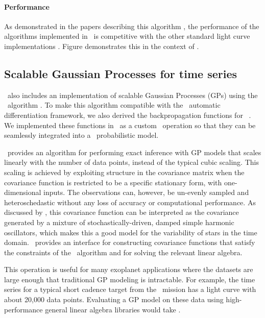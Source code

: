 \documentclass[modern]{aastex62}
\begin{document}
\paragraph{Performance}
As demonstrated in the papers describing this algorithm \citep{Luger:2019} , the performance of the algorithms implemented in \starry\ is competitive with the other standard light curve implementations .
Figure  demonstrates this in the context of \exoplanet.


\subsection{Scalable Gaussian Processes for time series}

\exoplanet\ also includes an implementation of scalable Gaussian Processes (GPs) using the \celerite\ algorithm \citep{Foreman-Mackey:2017}.
To make this algorithm compatible with the \theano\ automatic differentiation framework, we also derived the backpropagation functions for \celerite\ \citep{Foreman-Mackey:2018a}.
We implemented these functions in \cpp\ as a custom \theano\ operation so that they can be seamlessly integrated into a \pymc\ probabilistic model.

\celerite\ provides an algorithm for performing exact inference with GP models that scales linearly with the number of data points, instead of the typical cubic scaling.
This scaling is achieved by exploiting structure in the covariance matrix when the covariance function is restricted to be a specific stationary form, with one-dimensional inputs.
The observations can, however, be un-evenly sampled and heteroschedastic without any loss of accuracy or computational performance.
As discussed by \citet{Foreman-Mackey:2017}, this covariance function can be interpreted as the covariance generated by a mixture of stochastically-driven, damped simple harmonic oscillators, which makes this a good model for the variability of stars in the time domain.
\exoplanet\ provides an interface for constructing covariance functions that satisfy the constraints of the \celerite\ algorithm and for solving the relevant linear algebra.

This operation is useful for many exoplanet applications where the datasets are large enough that traditional GP modeling is intractable.
For example, the time series for a typical short cadence target from the \tess\ mission has a light curve with about 20,000 data points.
Evaluating a GP model on these data using high-performance general linear algebra libraries would take .
\end{document}
